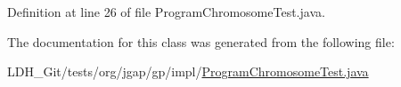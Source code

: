 Definition at line 26 of file Program\-Chromosome\-Test.\-java.



The documentation for this class was generated from the following file\-:\begin{DoxyCompactItemize}
\item 
L\-D\-H\-\_\-\-Git/tests/org/jgap/gp/impl/\hyperlink{_program_chromosome_test_8java}{Program\-Chromosome\-Test.\-java}\end{DoxyCompactItemize}
